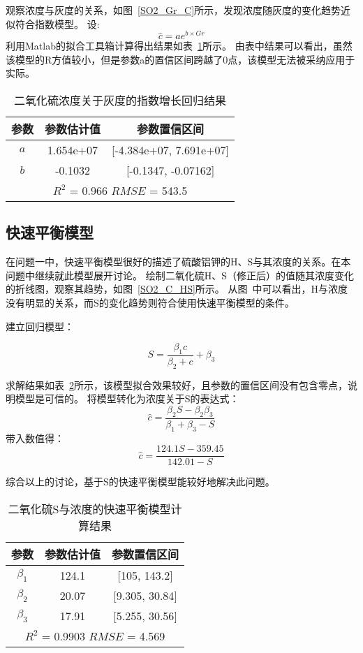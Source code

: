 观察浓度与灰度的关系，如图~\ref{SO2_Gr_C}所示，发现浓度随灰度的变化趋势近似符合指数模型。
设:
 $$\hat{c}=ae^{b\times Gr}$$
利用Matlab的拟合工具箱计算得出结果如表~\ref{SO2_Gr_exp}所示。
由表中结果可以看出，虽然该模型的R方值较小，但是参数a的置信区间跨越了0点，该模型无法被采纳应用于实际。
\begin{table}[]
    \centering
    \caption{二氧化硫浓度关于灰度的指数增长回归结果}
    \label{SO2_Gr_exp}
    \begin{tabular}{@{}ccc@{}}
    \toprule
    参数       & 参数估计值      & 参数置信区间                   \\ \midrule
    $a$      & 1.654e+07     & {[}-4.384e+07, 7.691e+07{]}     \\
    $b$      &  -0.1032      & {[}-0.1347, -0.07162{]}       \\ \midrule
    \multicolumn{3}{c}{$R^2$ = 0.966 $RMSE$ = 543.5} \\ \bottomrule
    \end{tabular}
\end{table}


\subsection{快速平衡模型}

在问题一中，快速平衡模型很好的描述了硫酸铝钾的H、S与其浓度的关系。在本问题中继续就此模型展开讨论。
绘制二氧化硫H、S（修正后）的值随其浓度变化的折线图，观察其趋势，如图~\ref{SO2_C_HS}所示。
从图~中可以看出，H与浓度没有明显的关系，而S的变化趋势则符合使用快速平衡模型的条件。



建立回归模型：


   $$ S = \frac{\beta_1 c}{\beta_2+c}+\beta_3$$


求解结果如表~\ref{SO2_S_MM}所示，该模型拟合效果较好，且参数的置信区间没有包含零点，说明模型是可信的。
将模型转化为浓度关于S的表达式：
$$\hat{c} = \frac{\beta_2S-\beta_2 \beta_3}{\beta_1+\beta_3-S}$$
带入数值得：
$$\hat{c} = \frac{124.1S-359.45}{142.01-S}$$



综合以上的讨论，基于S的快速平衡模型能较好地解决此问题。

\begin{table}[]
    \centering
    \caption{二氧化硫S与浓度的快速平衡模型计算结果}
    \label{SO2_S_MM}
    \begin{tabular}{@{}ccc@{}}
    \toprule
    参数       & 参数估计值      & 参数置信区间                   \\ \midrule
    $\beta_1$      & 124.1     & {[}105, 143.2{]}     \\
    $\beta_2$      & 20.07     & {[}9.305, 30.84{]}     \\
    $\beta_3$      & 17.91      & {[}5.255, 30.56{]}       \\ \midrule
    \multicolumn{3}{c}{$R^2$ = 0.9903 $RMSE$ = 4.569} \\ \bottomrule
    \end{tabular}
\end{table}
